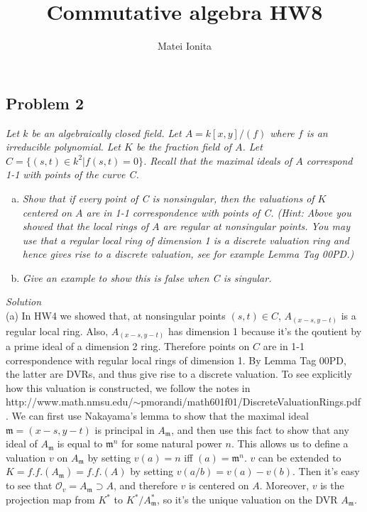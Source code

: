 \documentclass[12 pt]{article}
\title{Commutative algebra HW8}
\author{Matei Ionita}
\newcommand{\fr}{\mathfrak}
\begin{document}
  \maketitle


\subsection*{Problem 2}
\emph{Let $k$ be an algebraically closed field. Let $A = k[x, y]/(f)$ where $f$ is an irreducible polynomial. Let $K$ be the fraction field of $A$. Let $C = \{(s, t) \in k^2 | f(s, t) = 0\}$. Recall that the maximal ideals of $A$ correspond 1-1 with points of the curve C.}
\begin{enumerate} [(a)]
\item \emph{Show that if every point of C is nonsingular, then the valuations of $K$ centered on $A$ are in 1-1 correspondence with points of C. (Hint: Above you showed that the local rings of $A$ are regular at nonsingular points. You may use that a regular local ring of dimension 1 is a discrete valuation ring and hence gives rise to a discrete valuation, see for example Lemma Tag 00PD.)}
\item \emph{Give an example to show this is false when C is singular.}
\end{enumerate}
\vspace{5mm}
\emph{Solution}
\\
(a) In HW4 we showed that, at nonsingular points $(s,t) \in C$, $A_{(x-s, y-t)}$ is a regular local ring. Also, $A_{(x-s, y-t)}$ has dimension 1 because it's the qoutient by a prime ideal of a dimension 2 ring. Therefore points on $C$ are in 1-1 correspondence with regular local rings of dimension 1. By Lemma Tag 00PD, the latter are DVRs, and thus give rise to a discrete valuation. To see explicitly how this valuation is constructed, we follow the notes in http://www.math.nmsu.edu/$\sim$pmorandi/math601f01/DiscreteValuationRings.pdf . We can first use Nakayama's lemma to show that the maximal ideal $\fr m = (x-s, y-t)$ is principal in $A_{\fr m}$, and then use this fact to show that any ideal of $A_{\fr m}$ is equal to $\fr m^n$ for some natural power $n$. This allows us to define a valuation $v$ on $A_{\fr m}$ by setting $v(a) = n$ iff $(a) = \fr m^n$. $v$ can be extended to $K = f.f. (A_{\fr m}) = f.f. (A)$ by setting $v(a/b) = v(a) - v(b)$. Then it's easy to see that $\mathcal{O}_v = A_{\fr m} \supset A$, and therefore $v$ is centered on $A$. Moreover, $v$ is the projection map from $K^*$ to $K^*/A_{\fr m}^*$, so it's the unique valuation on the DVR $A_{\fr m}$.
\end{document}

